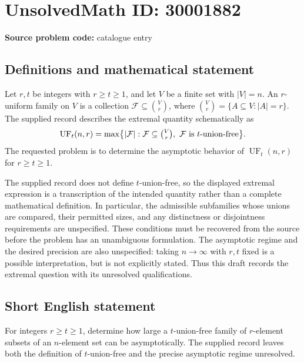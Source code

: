\documentclass[11pt]{article}
\begin{document}
\section*{UnsolvedMath ID: 30001882}
\textbf{Source problem code:} catalogue entry
\subsection{Definitions and mathematical statement}
Let \(r,t\) be integers with \(r\geq t\geq1\), and let \(V\) be a finite set with \(|V|=n\). An \(r\)-uniform family on \(V\) is a collection \(\mathcal F\subseteq\binom{V}{r}\), where \(\binom{V}{r}=\{A\subseteq V:|A|=r\}\). The supplied record describes the extremal quantity schematically as
\[
\operatorname{UF}_t(n,r)=\max\bigl\{|\mathcal F|:\mathcal F\subseteq\tbinom{V}{r},\ \mathcal F\text{ is }t\text{-union-free}\bigr\}.
\]
The requested problem is to determine the asymptotic behavior of \(\operatorname{UF}_t(n,r)\) for \(r\geq t\geq1\).

The supplied record does not define \(t\)-union-free, so the displayed extremal expression is a transcription of the intended quantity rather than a complete mathematical definition. In particular, the admissible subfamilies whose unions are compared, their permitted sizes, and any distinctness or disjointness requirements are unspecified. These conditions must be recovered from the source before the problem has an unambiguous formulation. The asymptotic regime and the desired precision are also unspecified: taking \(n\to\infty\) with \(r,t\) fixed is a possible interpretation, but is not explicitly stated. Thus this draft records the extremal question with its unresolved qualifications.
\subsection{Short English statement}
For integers \(r\geq t\geq1\), determine how large a \(t\)-union-free family of \(r\)-element subsets of an \(n\)-element set can be asymptotically. The supplied record leaves both the definition of \(t\)-union-free and the precise asymptotic regime unresolved.
\end{document}
